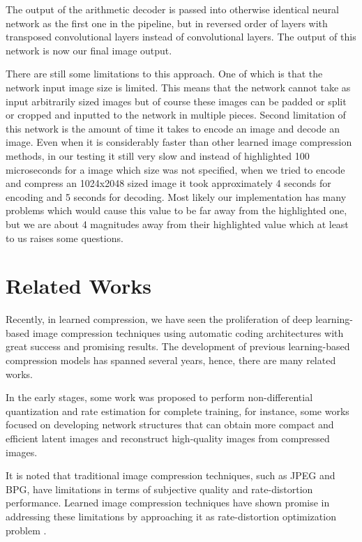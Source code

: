 \documentclass{article}
\begin{document}
The output of the arithmetic decoder is passed into otherwise identical neural network as the first one in the pipeline, but in reversed order of layers with transposed convolutional layers instead of convolutional layers.
The output of this network is now our final image output. 

There are still some limitations to this approach. 
One of which is that the network input image size is limited.
This means that the network cannot take as input arbitrarily sized images but of course these images can be padded or split or cropped and inputted to the network in multiple pieces.
Second limitation of this network is the amount of time it takes to encode an image and decode an image. 
Even when it is considerably faster than other learned image compression methods, in our testing it still very slow and instead of highlighted 100 microseconds for a image which size was not specified, when we tried to encode and compress an 1024x2048 sized image it took approximately 4 seconds for encoding and 5 seconds for decoding.
Most likely our implementation has many problems which would cause this value to be far away from the highlighted one, but we are about 4 magnitudes away from their highlighted value which at least to us raises some questions.


\section{Related Works}
\label{sec:related_works}
Recently, in learned compression, we have seen the proliferation of deep learning-based image compression techniques using automatic coding architectures with great success and promising results. The development of previous learning-based compression models has spanned several years, hence, there are many related works. 

In the early stages, some work was proposed to perform non-differential quantization and rate estimation for complete training, for instance, some works focused on developing network structures that can obtain more compact and efficient latent images and reconstruct high-quality images from compressed images. 

It is noted that traditional image compression techniques, such as JPEG and BPG, have limitations in terms of subjective quality and rate-distortion performance. Learned image compression techniques have shown promise in addressing these limitations by approaching it as rate-distortion optimization problem \cite{ELIC}.
\end{document}
